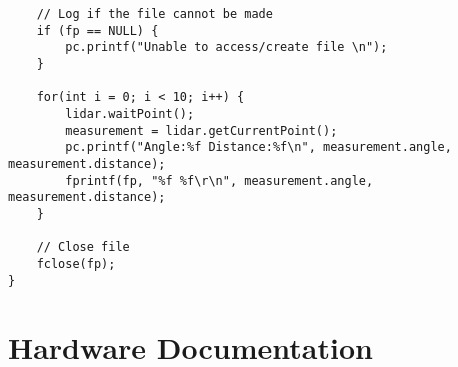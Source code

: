 \begin{appendices}
\begin{lstlisting}
	// Log if the file cannot be made
	if (fp == NULL) {
		pc.printf("Unable to access/create file \n");
	}

	for(int i = 0; i < 10; i++) {
		lidar.waitPoint();
		measurement = lidar.getCurrentPoint();
		pc.printf("Angle:%f Distance:%f\n", measurement.angle, measurement.distance);
		fprintf(fp, "%f %f\r\n", measurement.angle, measurement.distance);
	}
					
	// Close file
	fclose(fp);
}
			\end{lstlisting}
	
	\chapter{Hardware Documentation}
	
	\end{appendices}
			
